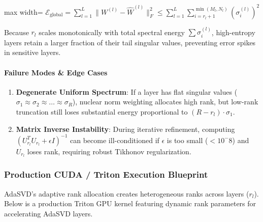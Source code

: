 \begin{center}
\begin{adjustbox}{max width=\columnwidth}
$\displaystyle
\mathcal{E}_{\text{global}} = \sum_{l=1}^{L} \|W^{(l)} - \hat{W}^{(l)}\|_F^2 \le \sum_{l=1}^{L} \sum_{i=r_l + 1}^{\min(M_l, N_l)} (\sigma_i^{(l)})^2
$
\end{adjustbox}
\end{center}

Because $r_l$ scales monotonically with total spectral energy $\sum \sigma_i^{(l)}$, high-entropy layers retain a larger fraction of their tail singular values, preventing error spikes in sensitive layers.

\paragraph{Failure Modes \& Edge Cases}
\begin{enumerate}
\item \textbf{Degenerate Uniform Spectrum}: If a layer has flat singular values ($\sigma_1 \approx \sigma_2 \approx \dots \approx \sigma_R$), nuclear norm weighting allocates high rank, but low-rank truncation still loses substantial energy proportional to $(R - r_l) \cdot \sigma_1$.
\item \textbf{Matrix Inverse Instability}: During iterative refinement, computing $(U_{r_l}^T U_{r_l} + \epsilon I)^{-1}$ can become ill-conditioned if $\epsilon$ is too small ($< 10^-8$) and $U_{r_l}$ loses rank, requiring robust Tikhonov regularization.


\end{enumerate}
\subsubsection*{Production CUDA / Triton Execution Blueprint}

AdaSVD's adaptive rank allocation creates heterogeneous ranks across layers ($r_l$). Below is a production Triton GPU kernel featuring dynamic rank parameters for accelerating AdaSVD layers.

